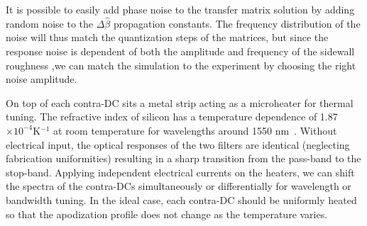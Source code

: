 \documentclass[osajnl,twocolumn,showpacs,superscriptaddress,10pt]{revtex4-1}
\newcommand{\me}{\mathrm{e}}
\begin{document}
%


It is possible to easily add phase noise to the transfer matrix solution by adding random noise to the $\Delta\hat{\beta}$ propagation constants. The frequency distribution of the noise will thus match the quantization steps of the matrices, but since the response noise is dependent of both the amplitude and frequency of the sidewall roughness \cite{simard2011impact},we can match the simulation to the experiment by choosing the right noise amplitude.


On top of each contra-DC sits a metal strip acting as a microheater for thermal tuning.  
The refractive index of silicon has a temperature dependence of 1.87$\times10^{-4}$K$^{-1}$ at room temperature for wavelengths around 1550 nm~\cite{frey2006temperature}.
Without electrical input, the optical responses of the two filters are identical (neglecting fabrication uniformities) resulting in a sharp transition from the pass-band to the stop-band. 
Applying independent electrical currents on the heaters, we can shift the spectra of the contra-DCs simultaneously or differentially for wavelength or bandwidth tuning.
In the ideal case, each contra-DC should be uniformly heated so that the apodization profile does not change as the temperature varies.


\end{document}
